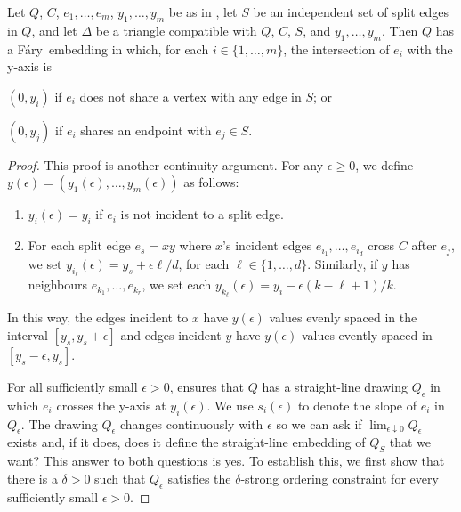 \documentclass{patmorin}
\newcommand{\Fary}{Fáry}
\begin{document}
\begin{thm}
   Let $Q$, $C$, $e_1,\ldots,e_m$, $y_1,\ldots,y_m$ be as in
  , let $S$ be an independent set of split edges in $Q$,
  and let $\Delta$ be a triangle compatible with $Q$, $C$, $S$, and
  $y_1,\ldots,y_m$.  Then $Q$ has a \Fary\ embedding in which, for
  each $i\in\{1,\ldots,m\}$, the intersection of $e_i$ with the y-axis is
  \begin{compactenum}
     \item $(0,y_i)$ if $e_i$ does not share a vertex with any edge in $S$; or
     \item $(0,y_j)$ if $e_i$ shares an endpoint with $e_j\in S$.
  \end{compactenum}
\end{thm}

\begin{proof}
  This proof is another continuity argument. For any $\epsilon \ge 0$, we define
  $y(\epsilon)=(y_1(\epsilon),\ldots,y_m(\epsilon))$ as follows:
  \begin{enumerate}
    \item $y_i(\epsilon)= y_i$ if $e_i$ is not incident to a split edge.
    \item For each split edge $e_s=xy$ where $x$'s incident edges
  $e_{i_1},\ldots,e_{i_d}$ cross $C$ after $e_j$, we
  set $y_{i_\ell}(\epsilon)=y_s+\epsilon\ell/d$, for each
  $\ell\in\{1,\ldots,d\}$.  Similarly, if $y$ has neighbours
  $e_{k_1},\ldots,e_{k_r}$, we set each $y_{k_\ell}(\epsilon)=y_i -
  \epsilon(k-\ell+1)/k$. 
  \end{enumerate}
  In this way, the edges incident to $x$ have $y(\epsilon)$ values evenly
  spaced in the interval $[y_s,y_s+\epsilon]$ and edges incident $y$
  have $y(\epsilon)$ values evently spaced in $[y_s-\epsilon,y_s]$.

  For all sufficiently small $\epsilon >0$,  ensures that
  $Q$ has a straight-line drawing $Q_\epsilon$ in which $e_i$ crosses
  the y-axis at $y_i(\epsilon)$. We use $s_i(\epsilon)$ to denote the
  slope of $e_i$ in $Q_\epsilon$.  The drawing $Q_\epsilon$ changes
  continuously with $\epsilon$ so we can ask if $\lim_{\epsilon\downarrow
  0}Q_\epsilon$ exists and, if it does, does it define the straight-line 
  embedding of $Q_S$ that
  we want?  This answer to both questions is yes.  To establish this,
  we first show that there is a $\delta>0$ such that $Q_\epsilon$ satisfies
  the $\delta$-strong ordering constraint for every sufficiently small
  $\epsilon >0$.


\end{proof}
\end{document}
